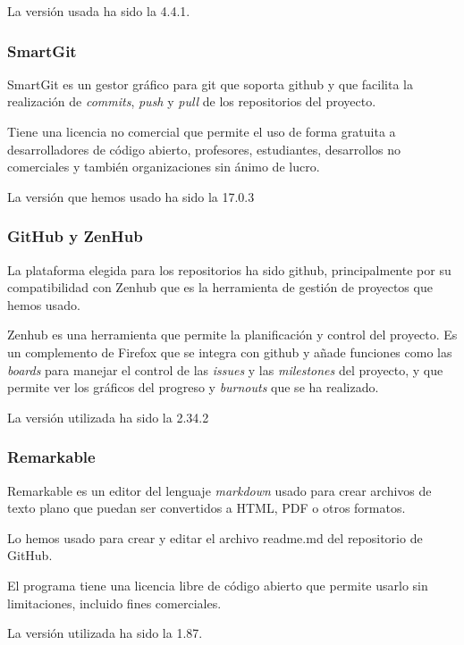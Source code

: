 La versión usada ha sido la 4.4.1.

\subsubsection{SmartGit}
SmartGit es un gestor gráfico para git que soporta github y que facilita la realización de \textit{commits}, \textit{push} y \textit{pull} de los repositorios del proyecto.

Tiene una licencia no comercial que permite el uso de forma gratuita a desarrolladores de código abierto, profesores, estudiantes, desarrollos no comerciales y también organizaciones sin ánimo de lucro.

La versión que hemos usado ha sido la 17.0.3

\subsubsection{GitHub y ZenHub}
La plataforma elegida para los repositorios ha sido github, principalmente por su compatibilidad con Zenhub que es la herramienta de gestión de proyectos que hemos usado.

Zenhub es una herramienta que permite la planificación y control del proyecto. Es un complemento de Firefox que se integra con github y añade funciones como las \textit{boards} para manejar el control de las \textit{issues} y las \textit{milestones} del proyecto, y que permite ver los gráficos del progreso y \textit{burnouts} que se ha realizado.

La versión utilizada ha sido la 2.34.2

\subsubsection{Remarkable}
Remarkable es un editor del lenguaje \textit{markdown} usado para crear archivos de texto plano que puedan ser convertidos a HTML, PDF o otros formatos.

Lo hemos usado para crear y editar el archivo readme.md del repositorio de GitHub.

El programa tiene una licencia libre de código abierto que permite usarlo sin limitaciones, incluido fines comerciales.

La versión utilizada ha sido la 1.87.
